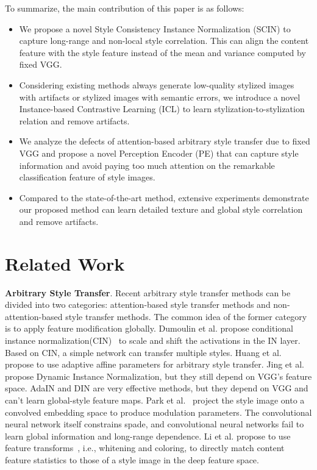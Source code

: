 \documentclass[times,twocolumn,final,authoryear]{elsarticle}
\begin{document}
To summarize, the main contribution of this paper is as follows:
\begin{itemize}
	\item We propose a novel Style Consistency Instance Normalization (SCIN) to capture long-range and non-local style correlation. This can align the content feature with the style feature instead of the mean and variance computed by fixed VGG.
\item Considering existing methods always generate low-quality stylized images with artifacts or stylized images with semantic errors, we introduce a novel Instance-based Contrastive Learning (ICL) to learn stylization-to-stylization relation and remove artifacts. 
\item We analyze the defects of attention-based arbitrary style transfer due to fixed VGG and propose a novel Perception Encoder (PE) that can capture style information and avoid paying too much attention on the remarkable classification feature of style images.
\item Compared to the state-of-the-art method, extensive experiments demonstrate our proposed method can learn detailed texture and global style correlation and remove artifacts.
\end{itemize}



\section{Related Work}
\textbf{Arbitrary Style Transfer}. Recent arbitrary style transfer methods can be divided into two categories: attention-based style transfer methods and non-attention-based style transfer methods. The common idea of the
former category is to apply feature modification globally. Dumoulin et al. propose conditional instance normalization(CIN)~\citep{gulrajani2017improved} to scale and shift the activations in the IN layer. Based on CIN, a simple network can transfer multiple styles. Huang et al.~\citep{huang2017arbitrary} propose to use adaptive affine parameters for arbitrary style transfer. Jing et al.~\citep{jing2020dynamic} propose Dynamic Instance Normalization, but they still depend on VGG's feature space. AdaIN and DIN are very effective methods, but they depend on VGG and can't learn global-style feature maps. 
Park et al.~\citep{park2019semantic} project the style image onto a convolved embedding space to produce modulation parameters. The convolutional neural network itself constrains spade, and convolutional neural networks fail to learn global information and long-range dependence.
Li et al. propose to use feature transforms~\cite {li2017universal}, i.e., whitening and coloring, to directly match content feature statistics to those of a style image in the deep feature space.
\end{document}
